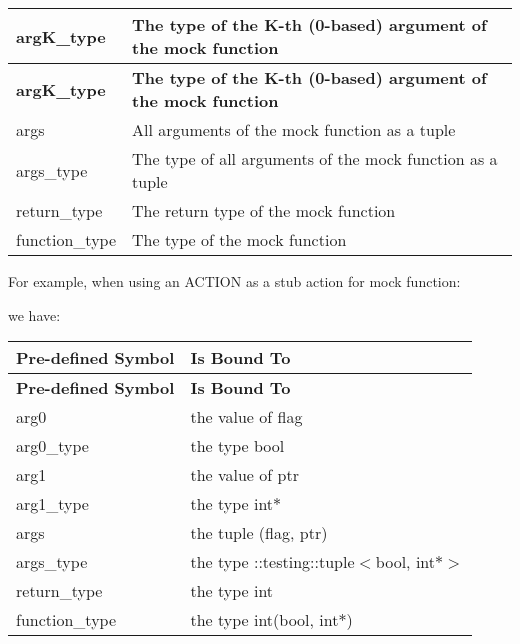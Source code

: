 \tabulinesep=1mm
\begin{longtabu}spread 0pt [c]{*{2}{|X[-1]}|}
\hline
\cellcolor{\tableheadbgcolor}\textbf{ {\ttfamily arg\+K\+\_\+type}  }&\cellcolor{\tableheadbgcolor}\textbf{ The type of the K-\/th (0-\/based) argument of the mock function   }\\
\endfirsthead
\hline
\endfoot
\hline
\cellcolor{\tableheadbgcolor}\textbf{ {\ttfamily arg\+K\+\_\+type}  }&\cellcolor{\tableheadbgcolor}\textbf{ The type of the K-\/th (0-\/based) argument of the mock function   }\\
\endhead
{\ttfamily args}  &All arguments of the mock function as a tuple   \\
{\ttfamily args\+\_\+type}  &The type of all arguments of the mock function as a tuple   \\
{\ttfamily return\+\_\+type}  &The return type of the mock function   \\
{\ttfamily function\+\_\+type}  &The type of the mock function   \\
\end{longtabu}


For example, when using an {\ttfamily A\+C\+T\+I\+ON} as a stub action for mock function\+: 
\begin{DoxyCode}{0}
\end{DoxyCode}
 we have\+:

\tabulinesep=1mm
\begin{longtabu}spread 0pt [c]{*{2}{|X[-1]}|}
\hline
\cellcolor{\tableheadbgcolor}\textbf{ {\bfseries{Pre-\/defined Symbol}}  }&\cellcolor{\tableheadbgcolor}\textbf{ {\bfseries{Is Bound To}}   }\\
\endfirsthead
\hline
\endfoot
\hline
\cellcolor{\tableheadbgcolor}\textbf{ {\bfseries{Pre-\/defined Symbol}}  }&\cellcolor{\tableheadbgcolor}\textbf{ {\bfseries{Is Bound To}}   }\\
\endhead
{\ttfamily arg0}  &the value of {\ttfamily flag}   \\
{\ttfamily arg0\+\_\+type}  &the type {\ttfamily bool}   \\
{\ttfamily arg1}  &the value of {\ttfamily ptr}   \\
{\ttfamily arg1\+\_\+type}  &the type {\ttfamily int$\ast$}   \\
{\ttfamily args}  &the tuple {\ttfamily (flag, ptr)}   \\
{\ttfamily args\+\_\+type}  &the type {\ttfamily \+::testing\+::tuple$<$bool, int$\ast$$>$}   \\
{\ttfamily return\+\_\+type}  &the type {\ttfamily int}   \\
{\ttfamily function\+\_\+type}  &the type {\ttfamily int(bool, int$\ast$)}   \\
\end{longtabu}


